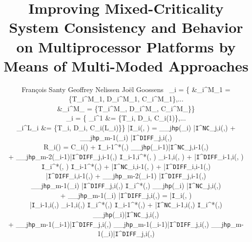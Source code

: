 \documentclass[10pt, conference, compsocconf, final]{IEEEtran}
\theoremstyle{definition}
\newcommand*{\nctiw}{{\bar{\texttt{I}}^\texttt{NC}}}
\newcommand*{\difftiw}{{\bar{\texttt{I}}^\texttt{DIFF}}}
\newcommand*{\upinter}{\bar{\texttt{I}}}
\newcommand*{\inter}{\texttt{I}}
\begin{document}
\title{\LARGE
	Improving Mixed-Criticality System Consistency and Behavior on Multiprocessor Platforms by Means of Multi-Moded Approaches
}

\author{Fran\c cois Santy \hspace{40 mm} Geoffrey Nelissen \hspace{40mm} Jo\"el Goossens \
	\tau_i = \{	&\tau_i^{M_1} = \{T_i^{M_1}, D_i^{M_1}, C_i^{M_1}\},... \\
			&\tau_i^{M_} = \{T_i^{M_}, D_i^{M_}, C_i^{M_\mathnormal{L}}\}\}

	\tau_i = \{	\tau_i^{1} &= \{T_i, D_i, C_i(1)\},... \\
			\tau_i^{L_i} &= \{T_i, D_i, C_i(L_i)\}\}	
\label{eq:upperBoundTotIntWorkload}
		\upinter_i(\Delta, \ell) = \sum_{\tau_j\in\texttt{hp}(\tau_i)} \nctiw_{j,i}(\Delta,\ell) + \sum_{\tau_j\in\texttt{hp}_{m-1}(\tau_{i})} \difftiw_{j,i}(\Delta,\ell)
	
		R_i(\ell) = C_i(\ell) + \left\lfloor \dfrac{\upinter_{i}(R_i(\ell), \ell)}{m} \right\rfloor
	\label{eq:case1:step1}
				\inter_{i-1}^*(\Delta,\ell) \leq \sum\limits_{\tau_j\in\texttt{hp}(\tau_{i-1})}\nctiw_{j,i-1}(\Delta,\ell) \\ 
					+ \sum_{\tau_j\in\texttt{hp}_{m-2}(\tau_{i-1})}\difftiw_{j,i-1}(\Delta,\ell)
			\label{eq:case1:step2}
				\inter_{i-1,i}^*(\Delta, \ell) \leq \nctiw_{i-1,i}(\Delta, \ell) + \difftiw_{i-1,i}(\Delta, \ell)
			
				\inter_i^*(\Delta, \ell) \leq \inter_{i-1}^*(\Delta,\ell) + \nctiw_{i,i-1}(\Delta, \ell) + \difftiw_{i,i-1}(\Delta,\ell)
			
				\difftiw_{i,i-1}(\Delta,\ell) + \sum_{\tau_j\in\texttt{hp}_{m-2}(\tau_{i-1})} \difftiw_{j,i-1}(\Delta,\ell) \\
					\leq \sum_{\tau_j\in\texttt{hp}_{m-1}(\tau_{i})} \difftiw_{j,i}(\Delta,\ell)
			\label{eq:case1:step5}
				\inter_i^*(\Delta,\ell) \leq \sum_{\tau_j\in\texttt{hp}(\tau_i)} \nctiw_{j,i}(\Delta,\ell) \\
					+ \sum_{\tau_j\in\texttt{hp}_{m-1}(\tau_{i})} \difftiw_{j,i}(\Delta,\ell) = \upinter_i(\Delta, \ell)
			
				\upinter_{i-1,i}(\Delta,\ell) \leq \nctiw_{i-1,i}(\Delta,\ell)
			\label{eq:step2}
				\inter_i^*(\Delta,\ell) \leq \inter_{i-1}^*(\Delta,\ell) + \nctiw_{i-1,i}(\Delta,\ell)
			\label{eq:step3}
				\inter_i^*(\Delta,\ell) \leq \sum\limits_{\tau_j\in\texttt{hp}(\tau_i)}\nctiw_{j,i}(\Delta,\ell) \\
					+ \sum_{\tau_j\in\texttt{hp}_{m-1}(\tau_{i-1})}\difftiw_{j,i}(\Delta,\ell) 
			\label{eq:step4}
				\sum_{\tau_j\in\texttt{hp}_{m-1}(\tau_{i-1})}\difftiw_{j,i}(\Delta,\ell) \leq \sum_{\tau_j\in\texttt{hp}_{m-1}(\tau_{i})}\difftiw_{j,i}(\Delta,\ell)
			
}
\end{document}
